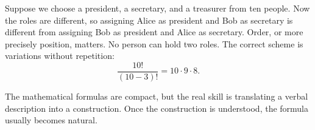 \begin{examplebox}
Suppose we choose a president, a secretary, and a treasurer from ten people. Now the roles are different, so assigning Alice as president and Bob as secretary is different from assigning Bob as president and Alice as secretary. Order, or more precisely position, matters. No person can hold two roles. The correct scheme is variations without repetition:
\[
\frac{10!}{(10-3)!}=10\cdot9\cdot8.
\]
\end{examplebox}

The mathematical formulas are compact, but the real skill is translating a verbal description into a construction. Once the construction is understood, the formula usually becomes natural.
